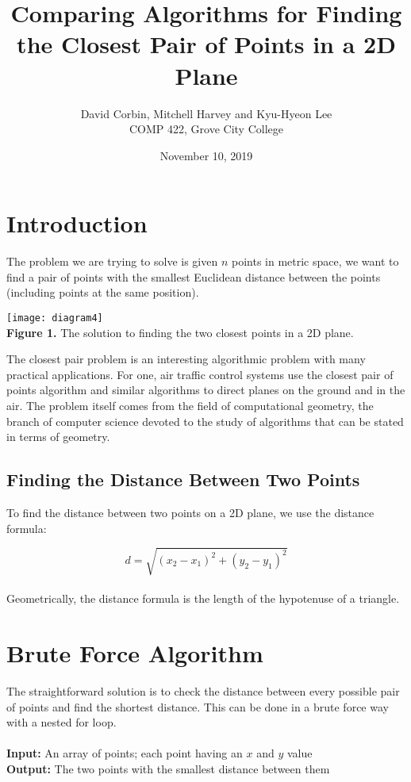 \documentclass[12pt]{report}
\begin{document}
\title{Comparing Algorithms for Finding the Closest Pair of Points in a 2D Plane}
\author{David Corbin, Mitchell Harvey and Kyu-Hyeon Lee\\COMP 422, Grove City College}
\date{November 10, 2019}
\maketitle

\section*{Introduction}

The problem we are trying to solve is given $n$ points in metric space,
we want to find a pair of points with the smallest Euclidean distance between the 
points (including points at the same position).

\begin{center}
\texttt{[image: diagram4]}
\\\textbf{Figure 1.} The solution to finding the two closest points in a 2D plane.
\end{center}
The closest pair problem is an interesting algorithmic problem with many practical applications. 
For one, air traffic control systems use the closest pair of points algorithm and similar algorithms to direct 
planes on the ground and in the air. The problem itself comes from the field of computational 
geometry, the branch of computer science devoted to the study of algorithms that can be stated in terms of geometry.


\subsection*{Finding the Distance Between Two Points}

To find the distance between two points on a 2D plane, we use the distance formula: 

$$d = \sqrt{(x_2 - x_1)^2 + (y_2 - y_1)^2}$$
\\Geometrically, the distance formula is the length of the hypotenuse of a triangle.


\section*{Brute Force Algorithm}

The straightforward solution is to check the distance between every possible pair of points and find the shortest distance. 
This can be done in a brute force way with a nested for loop.
\\
\\
\textbf{Input:} An array of points; each point having an $x$ and $y$ value
\\
\textbf{Output:} The two points with the smallest distance between them
\end{document}
